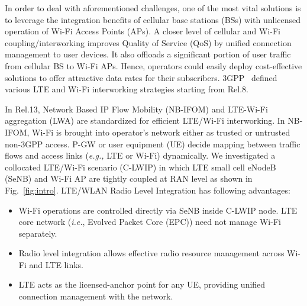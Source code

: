 \documentclass[conference]{IEEEtran}
\begin{document}
\par In order to deal with aforementioned challenges, one of the most vital solutions is to leverage the integration benefits of cellular base stations (BSs) with unlicensed operation of Wi-Fi Access Points (APs). A closer level of cellular and Wi-Fi coupling/interworking  improves Quality of Service (QoS) by unified connection management to user devices. It also offloads a significant portion of user traffic from cellular BS to Wi-Fi APs. Hence, operators could easily deploy cost-effective solutions to offer attractive data rates for their subscribers. 3GPP~\cite{thirdgpp} defined various LTE and Wi-Fi interworking strategies starting from Rel.8. 

In Rel.13, Network Based IP Flow Mobility (NB-IFOM) and LTE-Wi-Fi aggregation (LWA) are standardized for efficient LTE/Wi-Fi interworking. In NB-IFOM, Wi-Fi is brought into operator's network either as trusted or untrusted non-3GPP access. P-GW or user equipment (UE) decide mapping between traffic flows and access links (\emph{e.g.,} LTE or Wi-Fi) dynamically. We investigated a collocated LTE/Wi-Fi scenario (C-LWIP) in which LTE small cell eNodeB (SeNB) and Wi-Fi AP are tightly coupled at RAN level as shown in Fig.~\ref{fig:intro}. LTE/WLAN Radio Level Integration has following advantages: 
\begin{itemize}
\item Wi-Fi operations are controlled directly via SeNB inside C-LWIP node. LTE core network (\emph{i.e.}, Evolved Packet Core (EPC)) need not manage Wi-Fi separately.
\item Radio level integration allows effective radio resource management across Wi-Fi and LTE links.
\item LTE acts as the licensed-anchor point for any UE, providing unified connection management with the network.
\end{itemize}
\end{document}
